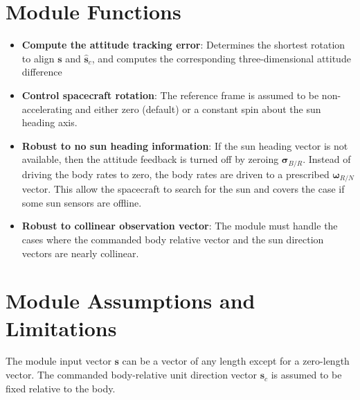 

\section{Module Functions}
\begin{itemize}
	\item \textbf{Compute the attitude tracking error}: Determines the shortest rotation to align $\bm s$ and $\hat{\bm s}_{c}$, and computes the corresponding three-dimensional attitude difference
	\item \textbf{Control spacecraft rotation}: The reference frame is assumed to be non-accelerating and either zero (default) or a constant spin about the sun heading axis.
	
	\item \textbf{Robust to no sun heading information}: If the sun heading vector is not available, then the attitude feedback is turned off by zeroing $\bm\sigma_{B/R}$.  Instead of driving the body rates to zero, the body rates are driven to a prescribed $\bm\omega_{R/N}$ vector.  This allow the spacecraft to search for the sun and covers the case if some sun sensors are offline.  
	
	\item \textbf{Robust to collinear observation vector}:  The module must handle the cases where the commanded body relative vector and the sun direction vectors are nearly collinear. 
\end{itemize}

\section{Module Assumptions and Limitations}
The module input vector $\bm s$ can be a vector of any length except for a zero-length vector.  The commanded body-relative unit direction vector ${\bm s}_{c}$ is assumed to be fixed relative to the body.  